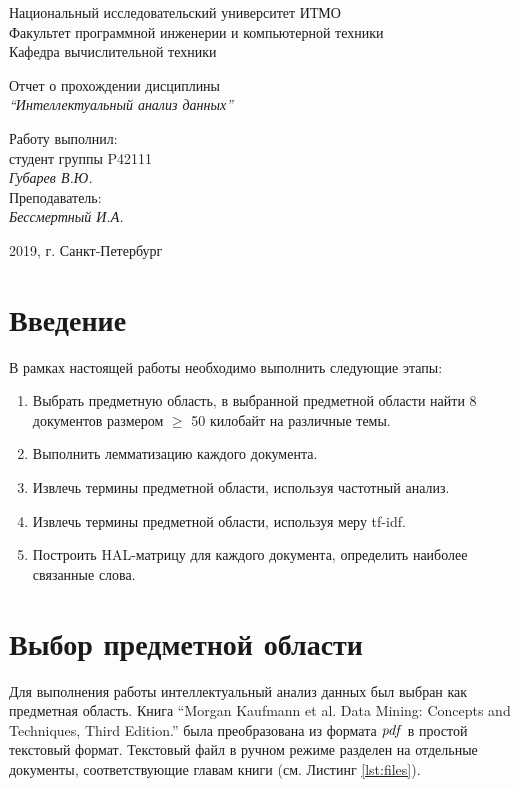 \documentclass[12pt, a4paper] {article}
\begin{document}
\thispagestyle{empty}
\begin{center}
  {\large
	Национальный исследовательский университет ИТМО\\
	Факультет программной инженерии и компьютерной техники\\
	Кафедра вычислительной техники
  }
\end{center}
\begin{center}
	{\large
		Отчет о прохождении дисциплины
	}\\
	\emph{
		``Интеллектуальный анализ данных''
	}
\end{center}
\begin{flushright}
	Работу выполнил:\\
	студент группы P42111\\
	{\it Губарев В.Ю.\\
	}
	Преподаватель:\\
	{\it Бессмертный И.А.\\}
\end{flushright}
\begin{center}
	2019, г. Санкт-Петербург
\end{center}
\newpage
\thispagestyle{empty}
\tableofcontents
\newpage
\section{Введение}
В рамках настоящей работы необходимо выполнить следующие этапы:
\begin{enumerate}
\item Выбрать предметную область, в выбранной предметной области найти 8 документов
размером $\geq$  50 килобайт на различные темы.
\item Выполнить лемматизацию каждого документа.
\item Извлечь термины предметной области, используя частотный анализ.
\item Извлечь термины предметной области, используя меру tf-idf.
\item Построить HAL-матрицу для каждого документа, определить наиболее связанные слова.
\end{enumerate}


\section{Выбор предметной области}
Для выполнения работы интеллектуальный анализ данных был выбран как предметная область. Книга ``Morgan Kaufmann et al. Data Mining: Concepts and Techniques, Third Edition.'' была преобразована из формата $\it pdf$ в простой текстовый формат. Текстовый файл в ручном режиме разделен на отдельные документы, соответствующие главам книги (см. Листинг \ref{lst:files}).
\end{document}
